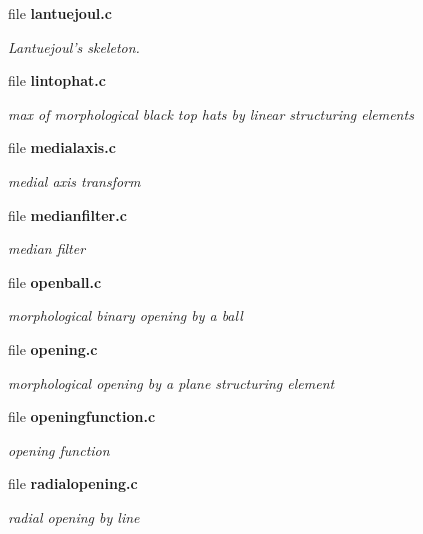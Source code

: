 \begin{CompactItemize}
\item 
file {\bf lantuejoul.c}
\begin{CompactList}\small\item\em Lantuejoul's skeleton. \item\end{CompactList}

\item 
file {\bf lintophat.c}
\begin{CompactList}\small\item\em max of morphological black top hats by linear structuring elements \item\end{CompactList}

\item 
file {\bf medialaxis.c}
\begin{CompactList}\small\item\em medial axis transform \item\end{CompactList}

\item 
file {\bf medianfilter.c}
\begin{CompactList}\small\item\em median filter \item\end{CompactList}

\item 
file {\bf openball.c}
\begin{CompactList}\small\item\em morphological binary opening by a ball \item\end{CompactList}

\item 
file {\bf opening.c}
\begin{CompactList}\small\item\em morphological opening by a plane structuring element \item\end{CompactList}

\item 
file {\bf openingfunction.c}
\begin{CompactList}\small\item\em opening function \item\end{CompactList}

\item 
file {\bf radialopening.c}
\begin{CompactList}\small\item\em radial opening by line \item\end{CompactList}


\end{CompactItemize}
